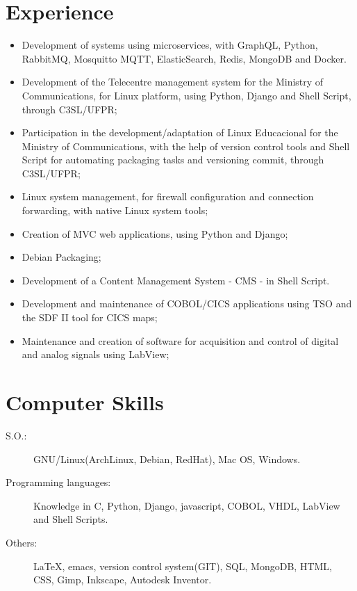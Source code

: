 \documentclass[pdftex, a4paper, 11pt]{article}
\begin{document}
\section*{Experience}
\begin{itemize}
  \item Development of systems using microservices, with GraphQL, Python, RabbitMQ, Mosquitto MQTT, ElasticSearch, Redis, MongoDB and Docker.
  \item Development of the Telecentre management system for the Ministry of Communications, for Linux platform, using Python, Django and Shell Script, through C3SL/UFPR;
  \item Participation in the development/adaptation of Linux Educacional for the Ministry of Communications, with the help of version control tools and Shell Script for automating packaging tasks and versioning commit, through C3SL/UFPR;
  \item Linux system management, for firewall configuration and connection forwarding, with native Linux system tools;
  \item Creation of MVC web applications, using Python and Django;
  \item Debian Packaging;
  \item Development of a Content Management System - CMS - in Shell Script.
  \item Development and maintenance of COBOL/CICS applications using TSO and the SDF II tool for CICS maps;
  \item Maintenance and creation of software for acquisition and control of digital and analog signals using LabView;
\end{itemize}

\section*{Computer Skills}
\begin{description}
\item[S.O.:] GNU/Linux(ArchLinux, Debian, RedHat), Mac OS, Windows.
\item[Programming languages:] Knowledge in C, Python, Django, javascript, COBOL, VHDL, LabView and Shell Scripts.
\item[Others:] \LaTeX, emacs, version control system(GIT), SQL, MongoDB, HTML, CSS, Gimp, Inkscape, Autodesk Inventor.
\end{description}
\end{document}
